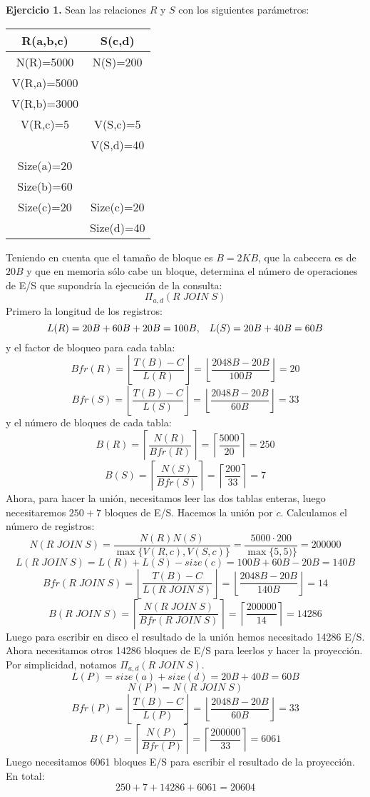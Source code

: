 \documentclass[12pt]{report}
\begin{document}
\textbf{Ejercicio 1.} Sean las relaciones $R$ y $S$ con los siguientes parámetros:

\begin{center}
\begin{tabular}{|c|c|}
\hline 
R(a,b,c) & S(c,d) \\ 
\hline 
N(R)=5000 & N(S)=200 \\ 
\hline 
V(R,a)=5000 &   \\ 
\hline 
V(R,b)=3000 &   \\ 
\hline 
V(R,c)=5 & V(S,c)=5 \\ 
\hline 
  & V(S,d)=40 \\ 
\hline 
Size(a)=20 &   \\ 
\hline 
Size(b)=60 &   \\ 
\hline 
Size(c)=20 & Size(c)=20 \\ 
\hline 
  & Size(d)=40 \\ 
\hline 
\end{tabular} 
\end{center} 

Teniendo en cuenta que el tamaño de bloque es $B=2KB$, que la cabecera es de $20B$ y que en memoria sólo cabe un bloque, determina el número de operaciones de E/S que supondría la ejecución de la consulta:
\[
\Pi_{a,d}(R\;JOIN\;S)
\]
Primero la longitud de los registros:
\[
L(R)=20B+60B+20B=100B, \;\;\; L(S)=20B+40B=60B
\]
y el factor de bloqueo para cada tabla:
\[
Bfr(R)=\left\lfloor\frac{T(B)-C}{L(R)}\right\rfloor=\left\lfloor\frac{2048B-20B}{100B}\right\rfloor=20
\]
\[
Bfr(S)=\left\lfloor\frac{T(B)-C}{L(S)}\right\rfloor=\left\lfloor\frac{2048B-20B}{60B}\right\rfloor=33
\]
y el número de bloques de cada tabla:
\[
B(R)=\left\lceil\frac{N(R)}{Bfr(R)}\right\rceil=\left\lceil\frac{5000}{20}\right\rceil= 250
\]
\[
B(S)=\left\lceil\frac{N(S)}{Bfr(S)}\right\rceil=\left\lceil\frac{200}{33}\right\rceil= 7
\]
Ahora, para hacer la unión, necesitamos leer las dos tablas enteras, luego necesitaremos $250+7$ bloques de E/S. Hacemos la unión por $c$. Calculamos el número de registros:
\[
N(R\;JOIN\;S)=\frac{N(R)N(S)}{\max\{V(R,c),V(S,c)\}}=\frac{5000\cdot 200}{\max\{5,5)\}}=200000
\]
\[
L(R\;JOIN\;S)=L(R)+L(S)-size(c)=100B+60B-20B=140B
\]
\[
Bfr(R\;JOIN\;S)=\left\lfloor\frac{T(B)-C}{L(R\;JOIN\;S)}\right\rfloor=\left\lfloor\frac{2048B-20B}{140B}\right\rfloor=14
\]
\[
B(R\;JOIN\;S)=\left\lceil\frac{N(R\;JOIN\;S)}{Bfr(R\;JOIN\;S)}\right\rceil=\left\lceil\frac{200000}{14}\right\rceil= 14286
\]
Luego para escribir en disco el resultado de la unión hemos necesitado 14286 E/S. Ahora necesitamos otros 14286 bloques de E/S para leerlos y hacer la proyección. Por simplicidad, notamos $\Pi_{a,d}(R\;JOIN\;S)$.
\[
L(P)=size(a)+size(d)=20B+40B=60B 
\]
\[
N(P)=N(R\;JOIN\;S)
\]
\[
Bfr(P)=\left\lfloor\frac{T(B)-C}{L(P)}\right\rfloor=\left\lfloor\frac{2048B-20B}{60B}\right\rfloor=33
\]
\[
B(P)=\left\lceil\frac{N(P)}{Bfr(P)}\right\rceil=\left\lceil\frac{200000}{33}\right\rceil= 6061
\]
Luego necesitamos 6061 bloques E/S para escribir el resultado de la proyección. En total:
\[
250+7+14286+6061=20604
\]
\end{document}
